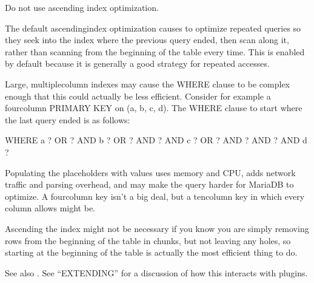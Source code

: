 \documentclass[letterpaper,10pt,english]{sphinxmanual}
\begin{document}
\begin{fulllineitems}
\label{\detokenize{mariadb-archiver:cmdoption-mariadb-archiver-no-ascend}}
Do not use ascending index optimization.

The default ascending\sphinxhyphen{}index optimization causes  to optimize
repeated  queries so they seek into the index where the previous query
ended, then scan along it, rather than scanning from the beginning of the table
every time.  This is enabled by default because it is generally a good strategy
for repeated accesses.

Large, multiple\sphinxhyphen{}column indexes may cause the WHERE clause to be complex enough
that this could actually be less efficient.  Consider for example a four\sphinxhyphen{}column
PRIMARY KEY on (a, b, c, d).  The WHERE clause to start where the last query
ended is as follows:

\begin{sphinxVerbatim}[commandchars=\\\{\}]
WHERE a \PYGZgt{} ?
   OR   ? AND b \PYGZgt{} ?
   OR   ? AND   ? AND c \PYGZgt{} ?
   OR   ? AND   ? AND   ? AND d \PYGZgt{} ?
\end{sphinxVerbatim}

Populating the placeholders with values uses memory and CPU, adds network
traffic and parsing overhead, and may make the query harder for MariaDB to
optimize.  A four\sphinxhyphen{}column key isn’t a big deal, but a ten\sphinxhyphen{}column key in which
every column allows  might be.

Ascending the index might not be necessary if you know you are simply removing
rows from the beginning of the table in chunks, but not leaving any holes, so
starting at the beginning of the table is actually the most efficient thing to
do.

See also {\hyperref[\detokenize{mariadb-archiver:cmdoption-mariadb-archiver-ascend-first}]{}}.  See “EXTENDING” for a discussion of how this
interacts with plugins.

\end{fulllineitems}
\end{document}
